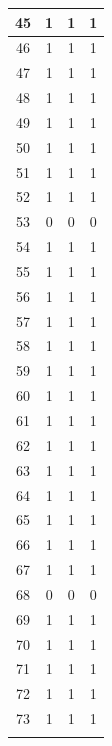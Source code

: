 \begin{longtable}[c]{|c|c|c|c|}
45 & 1 & 1 & 1 \\ \hline
\rowcolor[HTML]{81DAF5} 
46 & 1 & 1 & 1 \\ \hline
\rowcolor[HTML]{81DAF5} 
47 & 1 & 1 & 1 \\ \hline
\rowcolor[HTML]{81DAF5} 
48 & 1 & 1 & 1 \\ \hline
\rowcolor[HTML]{81DAF5} 
49 & 1 & 1 & 1 \\ \hline
\rowcolor[HTML]{81DAF5} 
50 & 1 & 1 & 1 \\ \hline
\rowcolor[HTML]{81DAF5} 
51 & 1 & 1 & 1 \\ \hline
\rowcolor[HTML]{81DAF5} 
52 & 1 & 1 & 1 \\ \hline
\rowcolor[HTML]{81DAF5} 
53 & 0 & 0 & 0 \\ \hline
\rowcolor[HTML]{81DAF5} 
54 & 1 & 1 & 1 \\ \hline
\rowcolor[HTML]{81DAF5} 
55 & 1 & 1 & 1 \\ \hline
\rowcolor[HTML]{81DAF5} 
56 & 1 & 1 & 1 \\ \hline
\rowcolor[HTML]{81DAF5} 
57 & 1 & 1 & 1 \\ \hline
\rowcolor[HTML]{81DAF5} 
58 & 1 & 1 & 1 \\ \hline
\rowcolor[HTML]{81DAF5} 
59 & 1 & 1 & 1 \\ \hline
\rowcolor[HTML]{81DAF5} 
60 & 1 & 1 & 1 \\ \hline
\rowcolor[HTML]{81DAF5} 
61 & 1 & 1 & 1 \\ \hline
\rowcolor[HTML]{81DAF5} 
62 & 1 & 1 & 1 \\ \hline
\rowcolor[HTML]{81DAF5} 
63 & 1 & 1 & 1 \\ \hline
\rowcolor[HTML]{81DAF5} 
64 & 1 & 1 & 1 \\ \hline
\rowcolor[HTML]{81DAF5} 
65 & 1 & 1 & 1 \\ \hline
\rowcolor[HTML]{81DAF5} 
66 & 1 & 1 & 1 \\ \hline
\rowcolor[HTML]{81DAF5} 
67 & 1 & 1 & 1 \\ \hline
\rowcolor[HTML]{81DAF5} 
68 & 0 & 0 & 0 \\ \hline
\rowcolor[HTML]{81DAF5} 
69 & 1 & 1 & 1 \\ \hline
\rowcolor[HTML]{81DAF5} 
70 & 1 & 1 & 1 \\ \hline
\rowcolor[HTML]{81DAF5} 
71 & 1 & 1 & 1 \\ \hline
\rowcolor[HTML]{81DAF5} 
72 & 1 & 1 & 1 \\ \hline
\rowcolor[HTML]{81DAF5} 
73 & 1 & 1 & 1 \\ \hline
\rowcolor[HTML]{81DAF5} 

\end{longtable}
